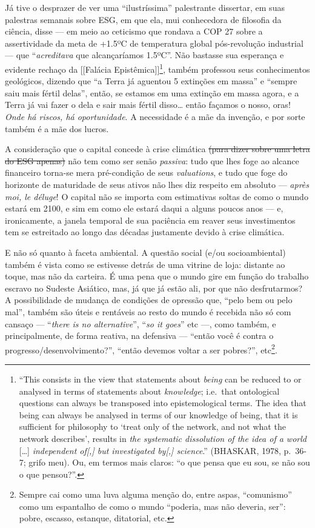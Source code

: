 Já tive o desprazer de ver uma ``ilustríssima'' palestrante dissertar,
em suas palestras semanais sobre ESG, em que ela, mui conhecedora de
filosofia da ciência, disse --- em meio ao ceticismo que rondava a COP
27 sobre a assertividade da meta de +1.5ºC de temperatura global
pós-revolução industrial --- que ``\emph{acreditava} que alcançaríamos
1.5ºC''. Não bastasse sua esperança e evidente rechaço da {[}{[}Falácia
Epistêmica{]}{]}\footnote{``This consists in the view that statements
  about \emph{being} can be reduced to or analysed in terms of
  statements about \emph{knowledge}; i.e.~that ontological questions can
  always be transposed into epistemological terms. The idea that being
  can always be analysed in terms of our knowledge of being, that it is
  sufficient for philosophy to `treat only of the network, and not what
  the network describes', results in \emph{the systematic dissolution of
  the idea of a world} {[}\ldots{]} \emph{independent of{[},{]} but
  investigated by{[},{]} science}.'' (BHASKAR, 1978, p.~36-7; grifo
  meu). Ou, em termos mais claros: ``o que pensa que eu sou, se não sou
  o que pensou?''.}, também professou seus conhecimentos geológicos,
dizendo que ``a Terra já aguentou 5 extinções em massa'' e ``sempre saiu
mais fértil delas'', então, se estamos em uma extinção em massa agora, e
a Terra já vai fazer o dela e sair mais fértil disso\ldots{} então
façamos o nosso, oras! \emph{Onde há riscos, há oportunidade}. A
necessidade é a mãe da invenção, e por sorte também é a mãe dos lucros.

A consideração que o capital concede à crise climática \st{(para dizer
sobre uma letra do ESG apenas)} não tem como ser senão \emph{passiva}:
tudo que lhes foge ao alcance financeiro torna-se mera pré-condição de
seus \emph{valuations}, e tudo que foge do horizonte de maturidade de
seus ativos não lhes diz respeito em absoluto --- \emph{après moi, le
déluge}! O capital não se importa com estimativas soltas de como o mundo
estará em 2100, e sim em como ele estará daqui a alguns poucos anos ---
e, ironicamente, a janela temporal de sua paciência em reaver seus
investimentos tem se estreitado ao longo das décadas justamente devido à
crise climática.

E não só quanto à faceta ambiental. A questão social (e/ou
socioambiental) também é vista como se estivesse detrás de uma vitrine
de loja: distante ao toque, mas não da carteira. É uma pena que o mundo
gire em função do trabalho escravo no Sudeste Asiático, mas, já que já
estão ali, por que não desfrutarmos? A possibilidade de mudança de
condições de opressão que, ``pelo bem ou pelo mal'', também são úteis e
rentáveis ao resto do mundo é recebida não só com cansaço ---
``\emph{there is no alternative}'', ``\emph{so it goes}'' etc ---, como
também, e principalmente, de forma reativa, na defensiva --- ``então
você é contra o progresso/desenvolvimento?'', ``então devemos voltar a
ser pobres?'', etc\footnote{Sempre cai como uma luva alguma menção do,
  entre aspas, ``comunismo'' como um espantalho de como o mundo
  ``poderia, mas não deveria, ser'': pobre, escasso, estanque,
  ditatorial, etc.}.

